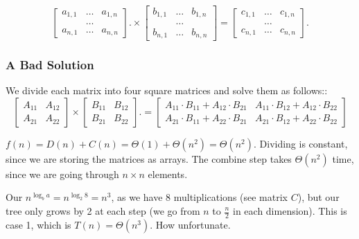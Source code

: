 \documentclass[11pt]{article}
\begin{document}
$$ \left[ \begin{array}{ccc}
    a_{1,1} & \dots & a_{1, n} \\
     & \dots & \\
    a_{n,1} & \dots & a_{n,n} 
\end{array}\right].
\times 
\left[ \begin{array}{ccc}
    b_{1,1} & \dots & b_{1, n} \\
     & \dots & \\
    b_{n,1} & \dots & b_{n,n} 
\end{array}\right]
=
\left[ \begin{array}{ccc}
    c_{1,1} & \dots & c_{1, n} \\
     & \dots & \\
    c_{n,1} & \dots & c_{n,n} 
\end{array}\right].
$$

\subsubsection{A Bad Solution}
We divide each matrix into four square matrices and solve them as follows::
$$ \left[ \begin{array}{c|c}
    A_{11} & A_{12} \\ \hline
    A_{21} & A_{22}
\end{array}\right]
\times 
\left[ \begin{array}{c|c}
    B_{11} & B_{12} \\ \hline
    B_{21} & B_{22}
\end{array}\right].
=
\left[ \begin{array}{c|c}
    A_{11} \cdot B_{11} + A_{12} \cdot B_{21} & A_{11} \cdot B_{12} + A_{12} \cdot B_{22} \\ \hline
    A_{21} \cdot B_{11} + A_{22} \cdot B_{21} & A_{21} \cdot B_{12} + A_{22} \cdot B_{22}
\end{array}\right]
$$

$f(n) = D(n) + C(n) = \Theta(1) + \Theta(n^2) = \Theta(n^2)$. Dividing is constant, since we are storing the matrices as arrays. The combine step takes $\Theta(n^2)$ time, since we are going through $n \times n$ elements.

Our $n^{\log_b a} = n^{\log_2 8} = n^3$, as we have 8 multiplications (see matrix $C$), but our tree only grows by 2 at each step (we go from $n$ to $\frac{n}{2}$ in each dimension). This is case 1, which is $T(n) = \Theta(n^3)$. How unfortunate.
\end{document}
